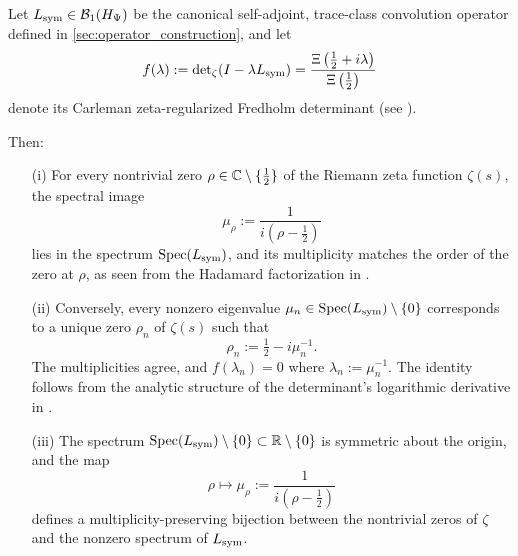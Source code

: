 \begin{lemma}
\label{lem:spectrum_zero_bijection}
Let \( L_{\mathrm{sym}} \in \mathcal{B}_1(H_{\Psi}) \) be the canonical self-adjoint, trace-class convolution operator defined in \cref{sec:operator_construction}, and let
\[
f(\lambda) := \det\nolimits_\zeta(I - \lambda L_{\mathrm{sym}}) = \frac{\Xi\left( \tfrac{1}{2} + i\lambda \right)}{\Xi\left( \tfrac{1}{2} \right)}
\]
denote its Carleman zeta-regularized Fredholm determinant (see ).

Then:

\begin{enumerate}
  \item[\textnormal{(i)}] For every nontrivial zero \( \rho \in \mathbb{C} \setminus \{\tfrac{1}{2}\} \) of the Riemann zeta function \( \zeta(s) \), the spectral image
  \[
  \mu_\rho := \frac{1}{i(\rho - \tfrac{1}{2})}
  \]
  lies in the spectrum \( \operatorname{Spec}(L_{\mathrm{sym}}) \), and its multiplicity matches the order of the zero at \( \rho \), as seen from the Hadamard factorization in .

  \item[\textnormal{(ii)}] Conversely, every nonzero eigenvalue \( \mu_n \in \operatorname{Spec}(L_{\mathrm{sym}}) \setminus \{0\} \) corresponds to a unique zero \( \rho_n \) of \( \zeta(s) \) such that
  \[
  \rho_n := \tfrac{1}{2} - i \mu_n^{-1}.
  \]
  The multiplicities agree, and \( f(\lambda_n) = 0 \) where \( \lambda_n := \mu_n^{-1} \). The identity follows from the analytic structure of the determinant's logarithmic derivative in .

  \item[\textnormal{(iii)}] The spectrum \( \operatorname{Spec}(L_{\mathrm{sym}}) \setminus \{0\} \subset \mathbb{R} \setminus \{0\} \) is symmetric about the origin, and the map
  \[
  \rho \mapsto \mu_\rho := \frac{1}{i(\rho - \tfrac{1}{2})}
  \]
  defines a multiplicity-preserving bijection between the nontrivial zeros of \( \zeta \) and the nonzero spectrum of \( L_{\mathrm{sym}} \).
\end{enumerate}
\end{lemma}
